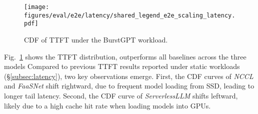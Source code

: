 {{%
\begin{figure}[h]
\centering
\texttt{[image: figures/eval/e2e/latency/shared\_legend\_e2e\_scaling\_latency.pdf]} \\
\vspace{-1em}
\caption{CDF of TTFT under the BurstGPT workload.
}
\label{fig:e2e_ttft}
\vspace{-10pt}
\end{figure}

Fig.~\ref{fig:e2e_ttft} shows the TTFT distribution, \SysName outperforms all baselines across the three models
Compared to previous TTFT results reported under static workloads (\S\ref{subsec:latency}), two key observations emerge. 
First, the CDF curves of \textit{NCCL} and \textit{FaaSNet} shift rightward, due to frequent model loading from SSD, leading to longer tail latency. 
Second, the CDF curve of \textit{ServerlessLLM} shifts leftward, likely due to a high cache hit rate when loading models into GPUs. 






}}

